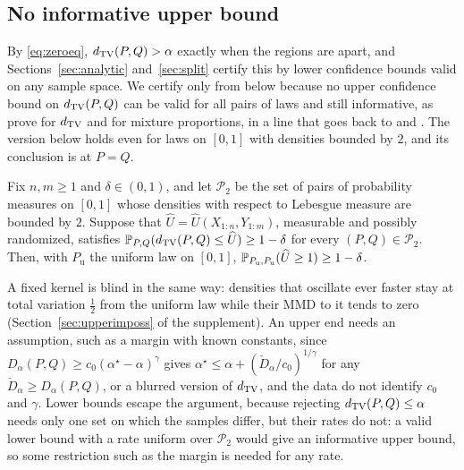 \subsection{No informative upper bound}
\label{sec:upper}

By \eqref{eq:zeroeq}, $d_{\mathrm{TV}}(P,Q)>\alpha$ exactly when the regions are apart, and Sections~\ref{sec:analytic}
and~\ref{sec:split} certify this by lower confidence bounds valid on any sample space. We certify only from below
because no upper confidence bound on $d_{\mathrm{TV}}(P,Q)$ can be valid for all pairs of laws and still informative, as
\citet[Theorem~1.1]{horebarber2026blurred} prove for $d_{\mathrm{TV}}$ and \citet[Theorem~9]{blanchard2010semi} for mixture
proportions, in a line that goes back to \citet{bahadursavage1956} and \citet{donoho1988onesided}. The version below
holds even for laws on $[0,1]$ with densities bounded by $2$, and its conclusion is at $P=Q$.

\begin{theorem}
\label{thm:impossible}
Fix $n,m\ge1$ and $\delta\in(0,1)$, and let $\mathcal P_2$ be the set of pairs of probability measures on $[0,1]$
whose densities with respect to Lebesgue measure are bounded by $2$. Suppose that
$\widehat U=\widehat U(X_{1:n},Y_{1:m})$, measurable and possibly randomized, satisfies
$\mathbb{P}_{P,Q}(d_{\mathrm{TV}}(P,Q)\le\widehat U)\ge1-\delta$ for every $(P,Q)\in\mathcal P_2$. Then, with $P_{\mathrm u}$ the uniform
law on $[0,1]$, $\mathbb{P}_{P_{\mathrm u},P_{\mathrm u}}(\widehat U\ge1)\ge1-\delta$.
\end{theorem}

A fixed kernel is blind in the same way: densities that oscillate ever faster stay at total variation $\tfrac12$ from
the uniform law while their MMD to it tends to zero (Section~\ref{sec:upperimposs} of the supplement). An upper end
needs an assumption, such as a margin with known constants, since $D_\alpha(P,Q)\ge c_0(\alpha^\star-\alpha)^\gamma$
gives $\alpha^\star\le\alpha+(\check D_\alpha/c_0)^{1/\gamma}$ for any $\check D_\alpha\ge D_\alpha(P,Q)$, or a blurred
version of $d_{\mathrm{TV}}$, and the data do not identify $c_0$ and $\gamma$. Lower bounds escape the argument, because rejecting
$d_{\mathrm{TV}}(P,Q)\le\alpha$ needs only one set on which the samples differ, but their rates do not: a valid lower bound with a
rate uniform over $\mathcal P_2$ would give an informative upper bound, so some restriction such as the margin is needed
for any rate.
